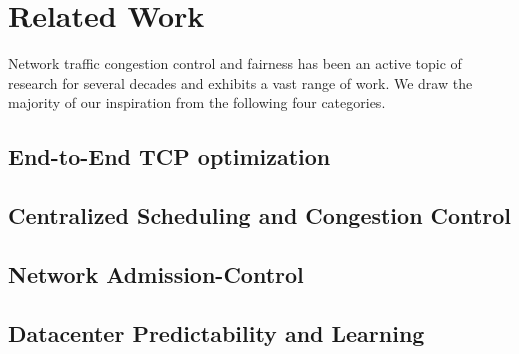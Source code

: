 \section{Related Work}
\label{sec:related}
Network traffic congestion control and fairness has been an active topic of 
research for several decades and exhibits a vast range of work. We draw the 
majority of our inspiration from the following four categories.
\subsection{End-to-End TCP optimization}
\subsection{Centralized Scheduling and Congestion Control}
\subsection{Network Admission-Control}
\subsection{Datacenter Predictability and Learning}
